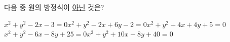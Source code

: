 다음 중 원의 방정식이 \underline{아닌} 것은?
\begin{choicesv}{$x^2+y^2-2x-3=0$}{$x^2+y^2-2x+6y-2=0$}{$x^2+y^2+4x+4y+5=0$}{$x^2+y^2-6x-8y+25=0$}{$x^2+y^2+10x-8y+40=0$}\end{choicesv}
